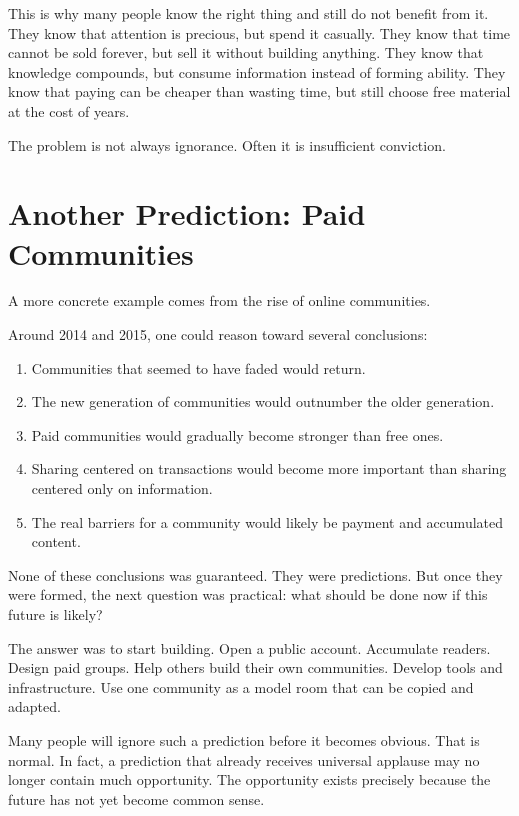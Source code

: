 This is why many people know the right thing and still do not benefit from it. They know that attention is precious, but spend it casually. They know that time cannot be sold forever, but sell it without building anything. They know that knowledge compounds, but consume information instead of forming ability. They know that paying can be cheaper than wasting time, but still choose free material at the cost of years.

The problem is not always ignorance. Often it is insufficient conviction.

\section*{Another Prediction: Paid Communities}

A more concrete example comes from the rise of online communities.

Around 2014 and 2015, one could reason toward several conclusions:

\begin{enumerate}
\item Communities that seemed to have faded would return.
\item The new generation of communities would outnumber the older generation.
\item Paid communities would gradually become stronger than free ones.
\item Sharing centered on transactions would become more important than sharing centered only on information.
\item The real barriers for a community would likely be payment and accumulated content.
\end{enumerate}

None of these conclusions was guaranteed. They were predictions. But once they were formed, the next question was practical: what should be done now if this future is likely?

The answer was to start building. Open a public account. Accumulate readers. Design paid groups. Help others build their own communities. Develop tools and infrastructure. Use one community as a model room that can be copied and adapted.

Many people will ignore such a prediction before it becomes obvious. That is normal. In fact, a prediction that already receives universal applause may no longer contain much opportunity. The opportunity exists precisely because the future has not yet become common sense.

